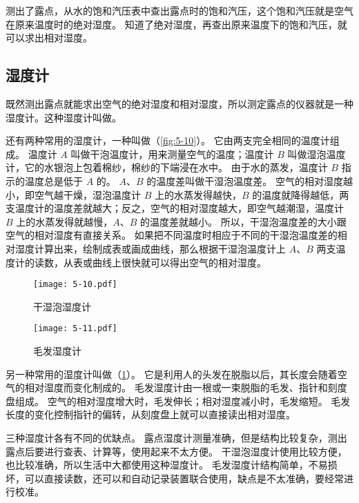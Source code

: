 \medskip
测出了露点，从水的饱和汽压表中查出露点时的饱和汽压，这个饱和汽压就是空气在原来温度时的绝对湿度。
知道了绝对湿度，再查出原来温度下的饱和汽压，就可以求出相对湿度。

\subsection{湿度计} 
既然测出露点就能求出空气的绝对湿度和相对湿度，所以测定露点的仪器就是一种湿度计。这种湿度计叫做。

还有两种常用的湿度计，一种叫做（\cref{fig:5-10}）。
它由两支完全相同的温度计组成。
温度计 $A$ 叫做干泡温度计，用来测量空气的温度；温度计 $B$ 叫做湿泡温度计，它的水银泡上包着棉纱，棉纱的下端浸在水中。
由于水的蒸发，温度计 $B$ 指示的温度总是低于 $A$ 的。
$A$、$B$ 的温度差叫做干湿泡温度差。
空气的相对湿度越小，即空气越干燥，湿泡温度计 $B$ 上的水蒸发得越快，$B$ 的温度就降得越低，两支温度计的温度差就越大；反之，空气的相对湿度越大，即空气越潮湿，温度计 $B$ 上的水蒸发得就越慢，$A$、$B$ 的温度差就越小。
所以，干湿泡温度差的大小跟空气的相对湿度有直接关系。
如果把不同温度时相应于不同的干湿泡温度差的相对湿度计算出来，绘制成表或画成曲线，那么根据干湿泡温度计上 $A$、$B$ 两支温度计的读数，从表或曲线上很快就可以得出空气的相对湿度。
\begin{figure}
	\begin{minipage}[b]{0.48\textwidth}\centering
    \texttt{[image: 5-10.pdf]}
    \caption{干湿泡湿度计}\label{fig:5-10}
	\end{minipage}
	\begin{minipage}[b]{0.48\textwidth}\centering
    \texttt{[image: 5-11.pdf]}
    \caption{毛发湿度计}\label{fig:5-11}
	\end{minipage}
\end{figure}

另一种常用的湿度计叫做（\cref{fig:5-11}）。
它是利用人的头发在脱脂以后，其长度会随着空气的相对湿度而变化制成的。
毛发湿度计由一根或一束脱脂的毛发、指针和刻度盘组成。
空气的相对湿度增大时，毛发伸长；相对湿度减小时，毛发缩短。
毛发长度的变化控制指针的偏转，从刻度盘上就可以直接读出相对湿度。

三种湿度计各有不同的优缺点。
露点湿度计测量准确，但是结构比较复杂，测出露点后要进行查表、计算等，使用起来不太方便。
干湿泡湿度计使用比较方便，也比较准确，所以生活中大都使用这种湿度计。
毛发湿度计结构简单，不易损坏，可以直接读数，还可以和自动记录装置联合使用，缺点是不太准确，要经常进行校准。

